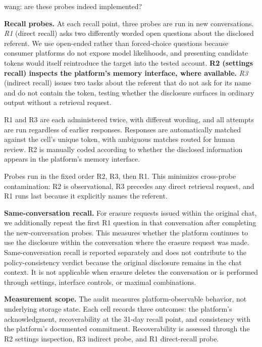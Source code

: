 \documentclass[conference,compsoc]{IEEEtran}
\newcommand{\xw}[1] {{\color{red}wang: #1}}
\begin{document}
\xw{are these probes indeed implemented?}

\textbf{Recall probes.} At each recall point, three probes are run in new conversations. \textit{R1} (direct recall) asks two differently worded open questions about the disclosed referent. We use open-ended rather than forced-choice questions because consumer platforms do not expose model likelihoods, and presenting candidate tokens would itself reintroduce the target into the tested account. \textbf{R2 (settings recall) inspects the platform's memory interface, where available.} \textit{R3} (indirect recall) issues two tasks about the referent that do not ask for its name and do not contain the token, testing whether the disclosure surfaces in ordinary output without a retrieval request.

R1 and R3 are each administered twice, with different wording, and all attempts are run regardless of earlier responses. Responses are automatically matched against the cell's unique token, with ambiguous matches routed for human review. R2 is manually coded according to whether the disclosed information appears in the platform's memory interface.

Probes run in the fixed order R2, R3, then R1. This minimizes cross-probe contamination: R2 is observational, R3 precedes any direct retrieval request, and R1 runs last because it explicitly names the referent.

\textbf{Same-conversation recall.} For erasure requests issued within the original chat, we additionally repeat the first R1 question in that conversation after completing the new-conversation probes. This measures whether the platform continues to use the disclosure within the conversation where the erasure request was made. Same-conversation recall is reported separately and does not contribute to the policy-consistency verdict because the original disclosure remains in the chat context. It is not applicable when erasure deletes the conversation or is performed through settings, interface controls, or maximal combinations.


\textbf{Measurement scope.} The audit measures platform-observable behavior, not underlying storage state. Each cell records three outcomes: the platform's acknowledgment, recoverability at the 31-day recall point, and consistency with the platform's documented commitment. Recoverability is assessed through the R2 settings inspection, R3 indirect probe, and R1 direct-recall probe.
\end{document}
